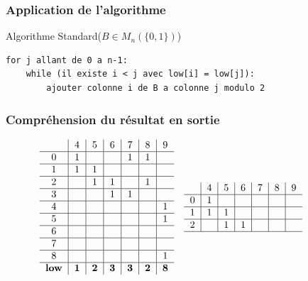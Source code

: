 \documentclass{beamer}
\begin{document}
\begin{frame}[fragile]
    \frametitle{Application de l'algorithme}
    \begin{block}{Algorithme Standard($B \in M_n(\{0,1\})$)}
        \fontsize{9.5}{10}\selectfont
        \begin{lstlisting}
for j allant de 0 a n-1:
    while (il existe i < j avec low[i] = low[j]):
        ajouter colonne i de B a colonne j modulo 2
      \end{lstlisting}
    \end{block}
\end{frame}


\begin{frame}
    \frametitle{Compréhension du résultat en sortie}
    \begin{figure}
        \fontsize{6}{8}\selectfont
        \begin{math}
        \begin{array}{cc}
            \begin{tabular}{ c | c | c | c | c | c | c }
                  & 4 & 5 & 6 & 7 & 8 & 9 \\ \hline
                0 & 1 &   &   & 1 & 1 &   \\ \hline
                1 & 1 & 1 &   &   &   &   \\ \hline
                2 &   & 1 & 1 &   & 1 &   \\ \hline
                3 &   &   & 1 & 1 &   &   \\ \hline
                4 &   &   &   &   &   & 1 \\ \hline
                5 &   &   &   &   &   & 1 \\ \hline
                6 &   &   &   &   &   &   \\ \hline
                7 &   &   &   &   &   &   \\ \hline
                8 &   &   &   &   &   & 1 \\ \hline
                \textbf{low} & \textbf{1} & \textbf{2} & \textbf{3} & 
                \textbf{3} & \textbf{2} & \textbf{8}
            \end{tabular} & 
            \begin{tabular}{ c | c | c | c | c | c | c }
                  & 4 & 5 & 6 & 7 & 8 & 9 \\ \hline
                0 & 1 &   &   &   &   &   \\ \hline
                1 & 1 & 1 &   &   &   &   \\ \hline
                2 &   & 1 & 1 &   &   &   \\ \hline

\end{tabular}
\end{array}
\end{math}
\end{figure}
\end{frame}
\end{document}
